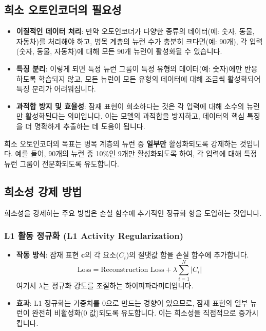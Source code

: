 \documentclass[11pt,a4paper]{article}
\begin{document}
\subsection{희소 오토인코더의 필요성}
\begin{itemize}
    \item \textbf{이질적인 데이터 처리}: 만약 오토인코더가 다양한 종류의 데이터(예: 숫자, 동물, 자동차)를 처리해야 하고, 병목 계층의 뉴런 수가 충분히 크다면(예: 90개), 각 입력(숫자, 동물, 자동차)에 대해 모든 90개 뉴런이 활성화될 수 있습니다.
    \item \textbf{특징 분리}: 이렇게 되면 특정 뉴런 그룹이 특정 유형의 데이터(예: 숫자)에만 반응하도록 학습되지 않고, 모든 뉴런이 모든 유형의 데이터에 대해 조금씩 활성화되어 특징 분리가 어려워집니다.
    \item \textbf{과적합 방지 및 효율성}: 잠재 표현이 희소하다는 것은 각 입력에 대해 소수의 뉴런만 활성화된다는 의미입니다. 이는 모델의 과적합을 방지하고, 데이터의 핵심 특징을 더 명확하게 추출하는 데 도움이 됩니다.
\end{itemize}

\begin{tcolorbox}[title=\textbf{희소 오토인코더의 목표}]
희소 오토인코더의 목표는 병목 계층의 뉴런 중 \textbf{일부만} 활성화되도록 강제하는 것입니다. 예를 들어, 90개의 뉴런 중 10\%인 9개만 활성화되도록 하여, 각 입력에 대해 특정 뉴런 그룹이 전문화되도록 유도합니다.
\end{tcolorbox}

\subsection{희소성 강제 방법}
희소성을 강제하는 주요 방법은 손실 함수에 추가적인 정규화 항을 도입하는 것입니다.

\subsubsection{L1 활동 정규화 (L1 Activity Regularization)}
\begin{itemize}
    \item \textbf{작동 방식}: 잠재 표현 $\mathbf{c}$의 각 요소($C_i$)의 절댓값 합을 손실 함수에 추가합니다.
        \begin{equation*}
        \text{Loss} = \text{Reconstruction Loss} + \lambda \sum_{i=1}^{N} |C_i|
        \end{equation*}
        여기서 $\lambda$는 정규화 강도를 조절하는 하이퍼파라미터입니다.
    \item \textbf{효과}: L1 정규화는 가중치를 0으로 만드는 경향이 있으므로, 잠재 표현의 일부 뉴런이 완전히 비활성화(0 값)되도록 유도합니다. 이는 희소성을 직접적으로 증가시킵니다.
\end{itemize}
\end{document}
